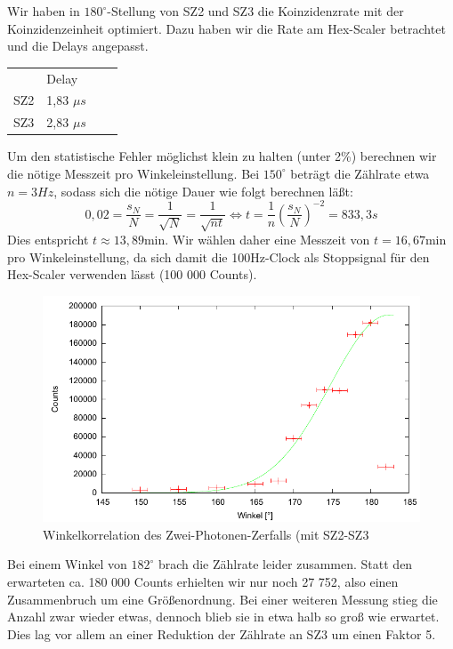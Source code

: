 Wir haben in $180^\circ$-Stellung von SZ2 und SZ3 die Koinzidenzrate mit der Koinzidenzeinheit optimiert. Dazu haben wir die Rate am Hex-Scaler betrachtet und die Delays angepasst.

\begin{center}
\begin{tabular}{llll}
 & Delay\\
SZ2 & 1,83 $\mu s$\\
SZ3 & 2,83 $\mu s$
\end{tabular}
\end{center}

Um den statistische Fehler möglichst klein zu halten (unter 2\%) berechnen wir die nötige Messzeit pro Winkeleinstellung. Bei $150^\circ$ beträgt die Zählrate etwa $n = 3 Hz$, sodass sich die nötige Dauer wie folgt berechnen läßt:
\begin{equation}
 0,02 = \frac{s_N}{N} = \frac{1}{\sqrt{N}} = \frac{1}{\sqrt{n t}} \Leftrightarrow t = \frac{1}{n}\left( \frac{s_N}{N} \right)^{-2} = 833,3s
\end{equation}
Dies entspricht $t \approx 13,89 \text{min}$. Wir wählen daher eine Messzeit von $t = 16,67 \text{min}$ pro Winkeleinstellung, da sich damit die 100Hz-Clock als Stoppsignal für den Hex-Scaler verwenden lässt (100 000 Counts). 

\begin{figure}
 \includegraphics[width=\textwidth]{Graphen/2er/erste.pdf}
 \caption{Winkelkorrelation des Zwei-Photonen-Zerfalls (mit SZ2-SZ3}
\end{figure}

Bei einem Winkel von $182^\circ$ brach die Zählrate leider zusammen. Statt den erwarteten ca. 180 000 Counts erhielten wir nur noch 27 752, also einen Zusammenbruch um eine Größenordnung. Bei einer weiteren Messung stieg die Anzahl zwar wieder etwas, dennoch blieb sie in etwa halb so groß wie erwartet. Dies lag vor allem an einer Reduktion der Zählrate an SZ3 um einen Faktor 5.  

